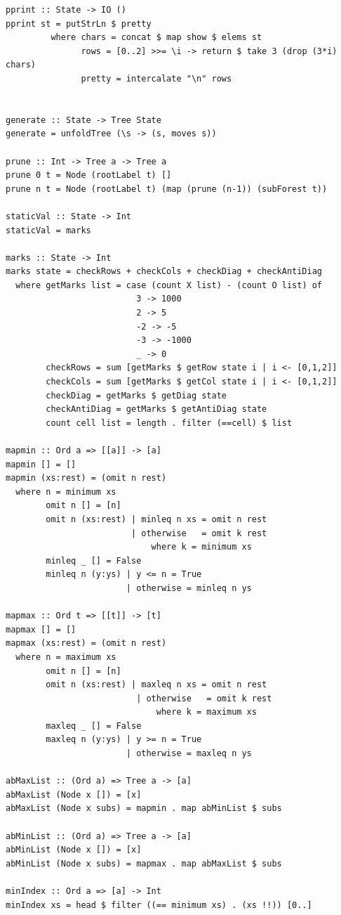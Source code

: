 \documentclass[titlepage]{article}
\begin{document}
\begin{verbatim}
pprint :: State -> IO ()
pprint st = putStrLn $ pretty
         where chars = concat $ map show $ elems st
               rows = [0..2] >>= \i -> return $ take 3 (drop (3*i) chars)
               pretty = intercalate "\n" rows


generate :: State -> Tree State
generate = unfoldTree (\s -> (s, moves s))

prune :: Int -> Tree a -> Tree a
prune 0 t = Node (rootLabel t) []
prune n t = Node (rootLabel t) (map (prune (n-1)) (subForest t))

staticVal :: State -> Int
staticVal = marks

marks :: State -> Int
marks state = checkRows + checkCols + checkDiag + checkAntiDiag
  where getMarks list = case (count X list) - (count O list) of
                          3 -> 1000
                          2 -> 5
                          -2 -> -5
                          -3 -> -1000
                          _ -> 0
        checkRows = sum [getMarks $ getRow state i | i <- [0,1,2]]
        checkCols = sum [getMarks $ getCol state i | i <- [0,1,2]]
        checkDiag = getMarks $ getDiag state
        checkAntiDiag = getMarks $ getAntiDiag state
        count cell list = length . filter (==cell) $ list

mapmin :: Ord a => [[a]] -> [a]
mapmin [] = []
mapmin (xs:rest) = (omit n rest)
  where n = minimum xs
        omit n [] = [n]
        omit n (xs:rest) | minleq n xs = omit n rest
                         | otherwise   = omit k rest
                             where k = minimum xs
        minleq _ [] = False
        minleq n (y:ys) | y <= n = True
                        | otherwise = minleq n ys

mapmax :: Ord t => [[t]] -> [t]
mapmax [] = []
mapmax (xs:rest) = (omit n rest)
  where n = maximum xs
        omit n [] = [n]
        omit n (xs:rest) | maxleq n xs = omit n rest
                          | otherwise   = omit k rest
                              where k = maximum xs
        maxleq _ [] = False
        maxleq n (y:ys) | y >= n = True
                        | otherwise = maxleq n ys

abMaxList :: (Ord a) => Tree a -> [a]
abMaxList (Node x []) = [x]
abMaxList (Node x subs) = mapmin . map abMinList $ subs

abMinList :: (Ord a) => Tree a -> [a]
abMinList (Node x []) = [x]
abMinList (Node x subs) = mapmax . map abMaxList $ subs

minIndex :: Ord a => [a] -> Int
minIndex xs = head $ filter ((== minimum xs) . (xs !!)) [0..]


\end{verbatim}
\end{document}
